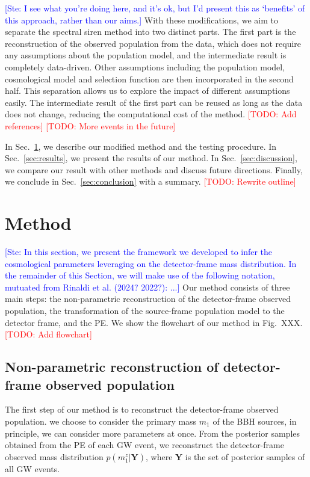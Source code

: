 \documentclass[aps,prd,twocolumn,superscriptaddress,preprintnumbers,nofootinbib,hidelinks]{revtex4-2}
\newcommand{\todo}[1]{\textcolor{red}{[TODO: #1]}}
\newcommand{\ste}[1]{\textcolor{blue}{[Ste: #1]}}
\begin{document}
\ste{I see what you're doing here, and it's ok, but I'd present this as `benefits' of this approach, rather than our aims.}
With these modifications, we aim to separate the spectral siren method into two distinct parts.
The first part is the reconstruction of the observed population from the data, which does not require any assumptions about the population model, and the intermediate result is completely data-driven.
Other assumptions including the population model, cosmological model and selection function are then incorporated in the second half.
This separation allows us to explore the impact of different assumptions easily.
The intermediate result of the first part can be reused as long as the data does not change, reducing the computational cost of the method.
\todo{Add references}
\todo{More events in the future}

In Sec.~\ref{sec:method}, we describe our modified method and the testing procedure.
In Sec.~\ref{sec:results}, we present the results of our method.
In Sec.~\ref{sec:discussion}, we compare our result with other methods and discuss future directions.
Finally, we conclude in Sec.~\ref{sec:conclusion} with a summary.
\todo{Rewrite outline}

\section{Method}
\label{sec:method}
\ste{In this section, we present the framework we developed to infer the cosmological parameters leveraging on the detector-frame mass distribution. In the remainder of this Section, we will make use of the following notation, mutuated from Rinaldi et al. (2024? 2022?): ...}
Our method consists of three main steps: the non-parametric reconstruction of the detector-frame observed population, the transformation of the source-frame population model to the detector frame, and the \ac{PE}.
We show the flowchart of our method in Fig.~XXX. \todo{Add flowchart}

\subsection{Non-parametric reconstruction of detector-frame observed population}
\label{sec:reconstruction}

The first step of our method is to reconstruct the detector-frame observed population.
we choose to consider the primary mass $m_1$ of the \ac{BBH} sources, in principle, we can consider more parameters at once.
From the posterior samples obtained from the \ac{PE} of each \ac{GW} event, we reconstruct the detector-frame observed mass distribution $p(m^z_1|\mathbf{Y})$, where $\mathbf{Y}$ is the set of posterior samples of all \ac{GW} events.
\end{document}
